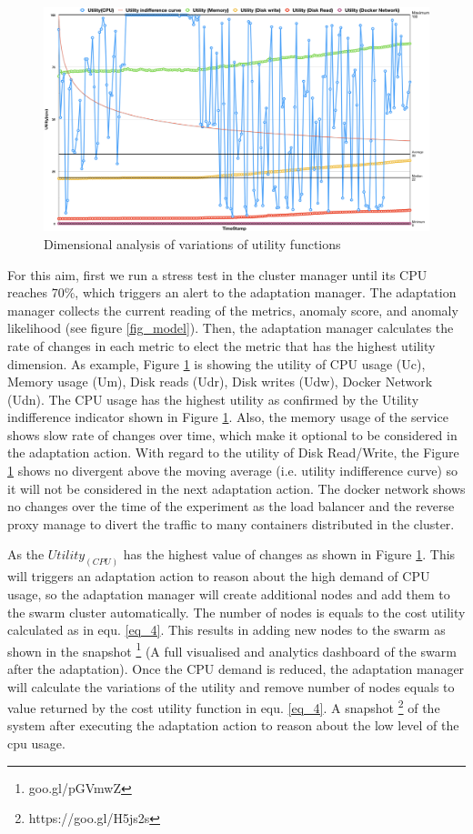 \documentclass[sigconf]{acmart}
\begin{document}
\begin{figure}[ht!] 
\includegraphics[scale=0.2]{demand}
\caption{ Dimensional analysis of variations of utility functions}
\label{fig_demand}
\end{figure}
For this aim, first we run a stress test in the cluster manager until its CPU reaches 70\%, which triggers an alert to the adaptation manager. The adaptation manager collects the current reading of the metrics, anomaly score, and anomaly likelihood (see figure \ref{fig_model}). Then, the adaptation manager calculates the rate of changes in each metric to elect the metric that has the highest utility dimension. As example, Figure \ref{fig_demand} is showing the utility of CPU usage (Uc), Memory usage (Um), Disk reads (Udr), Disk writes (Udw), Docker Network (Udn). The CPU usage has the highest utility as confirmed by the Utility indifference indicator shown in Figure \ref{fig_demand}. Also, the memory usage of the service shows slow rate of changes over time, which make it optional to be considered in the adaptation action. With regard to the utility of Disk Read/Write, the Figure \ref{fig_demand} shows no divergent above the moving average (i.e. utility indifference curve) so it will not be considered in the next adaptation action. The docker network shows no changes over the time of the experiment as the load balancer and the reverse proxy manage to divert the traffic to many containers distributed in the cluster. 

As the $Utility_(CPU)$ has the highest value of changes as shown in Figure \ref{fig_demand}. This will triggers an adaptation action to reason about the high demand of CPU usage, so the adaptation manager will create additional nodes and add them to the swarm cluster automatically. The number of nodes is equals to the cost utility calculated as in equ. \ref{eq_4}. This results in adding new nodes to the swarm as shown in the snapshot \footnote{goo.gl/pGVmwZ} (A full visualised and analytics dashboard of the swarm after the adaptation).
Once the CPU demand is reduced, the adaptation manager will calculate the variations of the utility and remove number of nodes equals to value returned by the cost utility function in equ. \ref{eq_4}. A snapshot \footnote{https://goo.gl/H5js2s} of the system after executing the adaptation action to reason about the low level of the cpu usage. 
\end{document}
